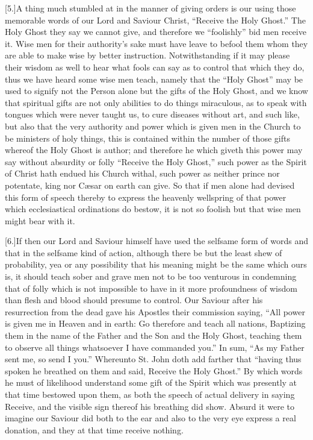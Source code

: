 [5.]A thing much stumbled at in the manner of giving orders is our using those memorable words of our Lord and Saviour Christ, “Receive the Holy Ghost.” The Holy Ghost they say we cannot give, and therefore we “foolishly” bid men receive it. Wise men for their authority’s sake must have leave to befool them whom they are able to make wise by better instruction. Notwithstanding if it may please their wisdom as well to hear what fools can say as to control that which they do, thus we have heard some wise men teach, namely that the “Holy Ghost” may be used to signify  not the Person alone but the gifts of the Holy Ghost,
 and we know that spiritual gifts are not only abilities to do things miraculous, as to speak with tongues which were never taught us, to cure diseases without art, and such like, but also that the very authority and power which is given men in the Church to be ministers of holy things, this is contained within the number of those gifts whereof the Holy Ghost is author; and therefore he which giveth this power may say without absurdity or folly “Receive the Holy Ghost,” such power as the Spirit of Christ hath endued his Church withal, such power as neither prince nor potentate, king nor Cæsar on earth can give. So that if men alone had devised this form of speech thereby to express the heavenly wellspring of that power which ecclesiastical ordinations do bestow, it is not so foolish but that wise men might bear with it.

[6.]If then our Lord and Saviour himself have used the selfsame form of words and that in the selfsame kind of action, although there be but the least shew of probability, yea or any possibility that his meaning might be the same which ours is, it should teach sober and grave men not to be too venturous in condemning that of folly which is not impossible to have in it more profoundness of wisdom than flesh and blood should presume to control. Our Saviour after his resurrection from the dead gave his Apostles their commission saying, “All power is given me in Heaven and in earth: Go therefore and teach all nations, Baptizing them in the name of the Father and the Son and the Holy Ghost, teaching them to observe all things whatsoever I have commanded you.” In sum, “As my Father sent me, so send I you.” Whereunto St. John doth add farther that “having thus spoken he breathed on them and said, Receive the Holy Ghost.” By which words he must of likelihood understand some gift of the Spirit which was presently at that time bestowed upon them, as both the speech of actual delivery in saying Receive, and the visible sign thereof his  breathing did show.
 Absurd it were to imagine our Saviour did both to the ear and also to the very eye express a real donation, and they at that time receive nothing.


